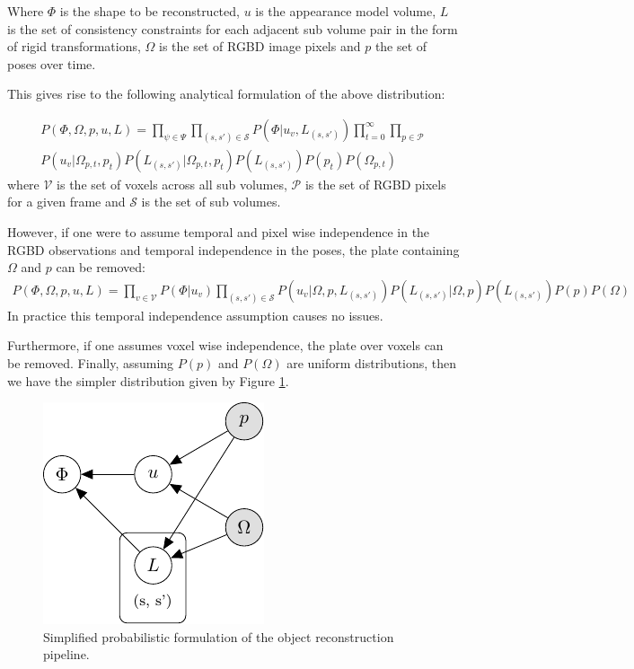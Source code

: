 Where $\Phi$ is the shape to be reconstructed, $u$ is the appearance model volume, $L$ is the 
set of consistency constraints for each adjacent sub volume pair in the form of rigid transformations, $\Omega$ is the set of 
RGBD image pixels and $p$ the set of poses over time.

This gives rise to the following analytical formulation of the above distribution:

\begin{equation}
\begin{split}
P(\Phi, \Omega, p, u, L) = 
\prod_{\psi \in \Psi}\prod_{(s, s') \in \mathcal{S}}P(\Phi|u_{v}, L_{(s, s')}) 
\prod_{t=0}^{\infty}\prod_{p \in \mathcal{P}}\\
P(u_{v}|\Omega_{p, t}, p_{t})
P(L_{(s, s')}|\Omega_{p, t}, p_{t})
P(L_{(s, s')})P(p_{t})P(\Omega_{p, t})
\end{split}
\end{equation}
where $\mathcal{V}$ is the set of voxels across all sub volumes, $\mathcal{P}$ is the set of RGBD pixels for a given 
frame and $\mathcal{S}$ is the set of sub volumes.

However, if one were to assume temporal and pixel wise independence in the RGBD observations and temporal independence in 
the poses, the plate containing $\Omega$ and $p$ can be removed:
\begin{equation}
\begin{split}
P(\Phi, \Omega, p, u, L) = 
\prod_{v \in \mathcal{V}}P(\Phi|u_{v})
\prod_{(s, s') \in \mathcal{S}}P(u_{v}|\Omega, p, L_{(s, s')})
P(L_{(s, s')}|\Omega, p) P(L_{(s, s')})P(p)P(\Omega)
\end{split}
\end{equation}
In practice this temporal independence assumption causes no issues.

Furthermore, if one assumes voxel wise independence, the plate over voxels can be removed. Finally, assuming $P(p)$ and 
$P(\Omega)$ are uniform distributions, then we have the simpler distribution given by Figure \ref{pgm2}.
\begin{figure}[!t]
	\centering
	\includegraphics{graphical_models/pgm2.pdf}
	\caption{Simplified probabilistic formulation of the object reconstruction pipeline.}
	\label{pgm2}
\end{figure}

